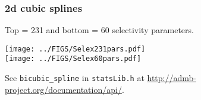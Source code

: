 \documentclass{beamer}
\begin{document}
\begin{frame}[t]\frametitle{2d cubic splines}
    Top = 231 and bottom = 60 selectivity parameters.
	\begin{center}
		\vspace{-0.15in}
		\texttt{[image: ../FIGS/Selex231pars.pdf]}\\
		\vspace{-0.4in}
		\texttt{[image: ../FIGS/Selex60pars.pdf]}
	\end{center}
	\vspace{-2.1in}
	See \texttt{bicubic\_spline}  in \texttt{statsLib.h}  at \url{http://admb-project.org/documentation/api/}.
\end{frame}

%

\end{document}
